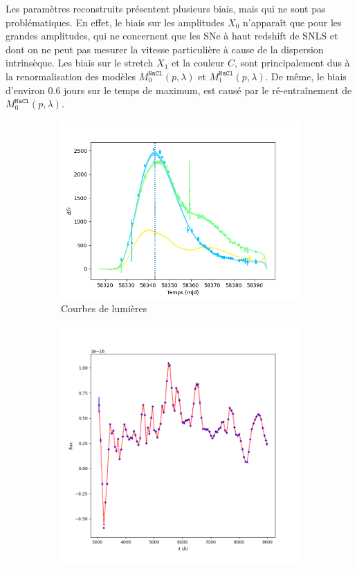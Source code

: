 \documentclass{book}
\def\nacl{\texttt{NaCl}\xspace}
\begin{document}
Les paramètres reconstruits présentent plusieurs biais, mais qui ne sont pas problématiques. En effet, le biais sur les amplitudes $X_0$ n'apparaît que pour les grandes amplitudes, qui ne concernent que les SNe à haut redshift de SNLS et dont on ne peut pas mesurer la vitesse particulière à cause de la dispersion intrinsèque. Les biais sur le stretch $X_1$ et la couleur $C$, sont principalement dus à la renormalisation des modèles $M_0^{\nacl}(p, \lambda)$ et $M_1^{\nacl}(p,\lambda)$. De même, le biais d'environ $0.6$ jours sur le temps de maximum, est causé par le ré-entraînement de $M_0^{\nacl}(p, \lambda)$.

\begin{figure}
	\centering
	\begin{subfigure}{0.45\textwidth}
		\centering
		\includegraphics[width=\textwidth]{figures/nacl_lc.png}
		\caption{Courbes de lumières}
		\label{fig:nacl_lc}
	\end{subfigure}
	\hfill
	\begin{subfigure}{0.45\textwidth}
		\centering
		\includegraphics[width=\textwidth]{figures/nacl_spec.png}

\end{subfigure}
\end{figure}
\end{document}
